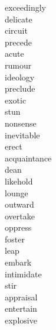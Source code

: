 \documentclass[a4paper, 10pt]{ctexart}
\begin{document}
\begin{multicols*}{2}
\begin{description}
\item[exceedingly]

\item[delicate]

\item[circuit]

\item[precede]

\item[acute]

\item[rumour]

\item[ideology]

\item[preclude]

\item[exotic]

\item[stun]

\item[nonsense]

\item[inevitable]

\item[erect]

\item[acquaintance]

\item[dean]

\item[likehold]

\item[lounge]

\item[outward]

\item[overtake]

\item[oppress]

\item[foster]

\item[leap]

\item[embark]

\item[intimidate]

\item[stir]

\item[appraisal]

\item[entertain]

\item[explosive]


\end{description}
\end{multicols*}
\end{document}

